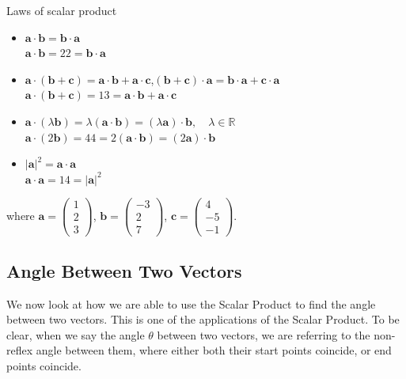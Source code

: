 \documentclass[a4paper]{book}
\newcommand{\cvv}[3]{\begin{pmatrix}#1\\#2\\#3\end{pmatrix}}
\begin{document}
\begin{theorem}{Laws of scalar product}
\begin{itemize}
\item $\mathbf a\cdot\mathbf b=\mathbf b\cdot\mathbf a$\\
{\small\color{black!50}$\mathbf a\cdot\mathbf b=22=\mathbf b\cdot\mathbf a$}
\item $\mathbf a\cdot(\mathbf b+\mathbf c)=\mathbf a\cdot\mathbf b+\mathbf a\cdot\mathbf c$,\quad $(\mathbf b+\mathbf c)\cdot\mathbf a=\mathbf b\cdot\mathbf a+\mathbf c\cdot\mathbf a$\\
{\small\color{black!50}$\mathbf a\cdot(\mathbf b+\mathbf c)=13=\mathbf a\cdot\mathbf b+\mathbf a\cdot\mathbf c$}
\item $\mathbf a\cdot(\lambda\mathbf b)=\lambda(\mathbf a\cdot\mathbf b)=(\lambda\mathbf a)\cdot\mathbf b,\quad\lambda\in\mathbb R$\\
{\small\color{black!50}$\mathbf a\cdot(2\mathbf b)=44=2(\mathbf a\cdot\mathbf b)=(2\mathbf a)\cdot\mathbf b$}
\item $|\mathbf a|^2=\mathbf a\cdot\mathbf a$\\
{\small\color{black!50}$\mathbf a\cdot\mathbf a=14=|\mathbf a|^2$}
\end{itemize}
{\small\color{black!50}where $\mathbf a=\cvv{1}{2}{3}$, $\mathbf b=\cvv{-3}{2}{7}$, $\mathbf c=\cvv{4}{-5}{-1}$.}
\end{theorem}



\subsection{Angle Between Two Vectors}
We now look at how we are able to use the Scalar Product to find the angle between two vectors. This is one of the applications of the Scalar Product. To be clear, when we say the angle $\theta$ between two vectors, we are referring to the non-reflex angle between them, where either both their start points coincide, or end points coincide.
\end{document}
